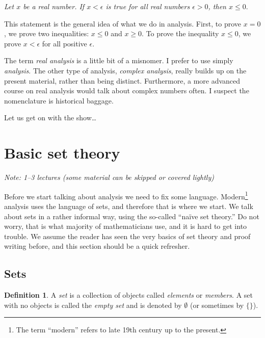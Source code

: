 \documentclass[12pt]{book}
\newcommand{\myindex}[1]{#1\index{#1}}
\newcommand{\sectionnotes}[1]{\noindent \emph{Note: #1} \medskip \par}
\newcommand{\sectionnewpage}{\clearpage}
\theoremstyle{plain}
\theoremstyle{remark}
\theoremstyle{definition}
\newtheorem{defn}[thm]{Definition}
\theoremstyle{exercise}
\theoremstyle{example}
\begin{document}
\medskip

\emph{Let $x$ be a real number.  If $x < \epsilon$ is true for all
real numbers
$\epsilon > 0$, then $x \leq 0$}.

\medskip

This statement is the general idea of what we do in analysis.  First, to
prove
$x = 0$, we prove two inequalities: $x \leq 0$ and $x \geq 0$.  To
prove the inequality
$x \leq 0$, we prove 
$x < \epsilon$ for all positive $\epsilon$.

\medskip

The term \emph{real analysis} is a little bit of a misnomer.  I prefer to
use simply \emph{analysis}.  The other type of analysis, 
\emph{complex analysis}, really builds up on the present material, rather than
being distinct.  Furthermore, a more advanced course on real
analysis would talk about complex numbers often.
I suspect the nomenclature is
historical baggage.

\medskip

Let us get on with the show\ldots



\sectionnewpage
\section{Basic set theory} \label{sec:basicset}

\sectionnotes{1--3 lectures (some material can be skipped or covered lightly)}

Before we start talking about analysis we need to fix some language.
Modern\footnote{The term ``modern'' refers to late 19th century up to
the present.}
analysis uses the language of sets, and therefore that is where we start.
We talk about sets in a rather informal way, using the so-called
``\myindex{na\"ive set theory}.''  Do not worry, that is what majority of
mathematicians use, and it is hard to get into trouble.
We assume the reader has seen the very basics of set theory
and proof writing before, and this section should be a quick refresher.

\subsection{Sets}

\begin{defn}
A \emph{\myindex{set}} is a collection of objects called
\emph{elements} or \emph{members}.  A set with
no objects is called the \emph{\myindex{empty set}} and is denoted by
$\emptyset$ (or sometimes by $\{ \}$).
\end{defn}
\end{document}
